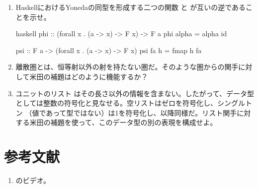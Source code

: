 \begin{enumerate}
  \tightlist
  \item
        HaskellにおけるYonedaの同型を形成する二つの関数  と  が互いの逆であることを示せ。

        \begin{snip}{haskell}
phi :: (forall x . (a -> x) -> F x) -> F a
phi alpha = alpha id

psi :: F a -> (forall x . (a -> x) -> F x)
psi fa h = fmap h fa
\end{snip}
  \item
        離散圏とは、恒等射以外の射を持たない圏だ。そのような圏からの関手に対して米田の補題はどのように機能するか？
  \item
        ユニットのリスト \code{{[}(){]}} はその長さ以外の情報を含まない。したがって、データ型としては整数の符号化と見なせる。空リストはゼロを符号化し、シングルトン \code{{[}(){]}}（値であって型ではない）は1を符号化し、以降同様だ。リスト関手に対する米田の補題を使って、このデータ型の別の表現を構成せよ。
\end{enumerate}

\section{参考文献}

\begin{enumerate}
  \tightlist
  \item
        のビデオ。
\end{enumerate}
